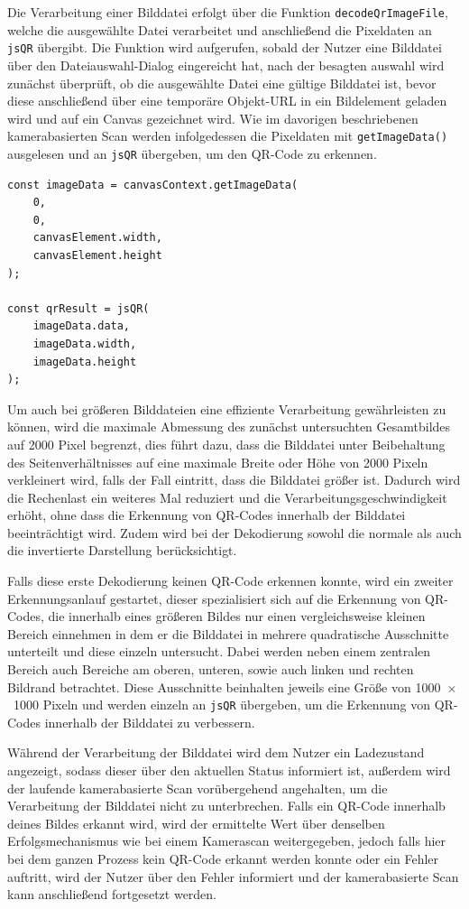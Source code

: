 ﻿\documentclass[oneside]{ausarbeitung}
\begin{document}
Die Verarbeitung einer Bilddatei erfolgt über die Funktion \texttt{decodeQrImageFile}, welche die ausgewählte Datei verarbeitet und
anschließend die Pixeldaten an \texttt{jsQR} übergibt. Die Funktion wird aufgerufen, sobald der Nutzer eine Bilddatei über den Dateiauswahl-Dialog
eingereicht hat, nach der besagten auswahl wird zunächst überprüft, ob die ausgewählte Datei eine gültige Bilddatei ist, bevor diese anschließend
über eine temporäre Objekt-URL in ein Bildelement geladen wird und auf ein Canvas gezeichnet wird. Wie im davorigen beschriebenen kamerabasierten
Scan werden infolgedessen die Pixeldaten mit \texttt{getImageData()} ausgelesen und an \texttt{jsQR} übergeben, um den QR-Code zu erkennen. 


\begin{verbatim}
const imageData = canvasContext.getImageData(
    0,
    0,
    canvasElement.width,
    canvasElement.height
);

const qrResult = jsQR(
    imageData.data,
    imageData.width,
    imageData.height
);
\end{verbatim}


Um auch bei größeren Bilddateien eine effiziente Verarbeitung gewährleisten zu können, wird die maximale Abmessung des zunächst untersuchten
Gesamtbildes auf 2000 Pixel begrenzt, dies führt dazu, dass die Bilddatei unter Beibehaltung des Seitenverhältnisses auf eine maximale Breite oder
Höhe von 2000 Pixeln verkleinert wird, falls der Fall eintritt, dass die Bilddatei größer ist. Dadurch wird die Rechenlast ein weiteres Mal reduziert
und die Verarbeitungsgeschwindigkeit erhöht, ohne dass die Erkennung von QR-Codes innerhalb der Bilddatei beeinträchtigt wird. Zudem wird bei
der Dekodierung sowohl die normale als auch die invertierte Darstellung berücksichtigt.

Falls diese erste Dekodierung keinen QR-Code erkennen konnte, wird ein zweiter Erkennungsanlauf gestartet, dieser spezialisiert sich auf die Erkennung
von QR-Codes, die innerhalb eines größeren Bildes nur einen vergleichsweise kleinen Bereich einnehmen in dem er die Bilddatei in mehrere quadratische
Ausschnitte unterteilt und diese einzeln untersucht. Dabei werden neben einem zentralen Bereich auch Bereiche am oberen, unteren, sowie auch linken
und rechten Bildrand betrachtet. Diese Ausschnitte beinhalten jeweils eine Größe von 1000~$\times$~1000 Pixeln und werden einzeln an \texttt{jsQR} 
übergeben, um die Erkennung von QR-Codes innerhalb der Bilddatei zu verbessern.

Während der Verarbeitung der Bilddatei wird dem Nutzer ein Ladezustand angezeigt, sodass dieser über den aktuellen Status informiert ist, außerdem
wird der laufende kamerabasierte Scan vorübergehend angehalten, um die Verarbeitung der Bilddatei nicht zu unterbrechen. Falls ein QR-Code innerhalb 
deines Bildes erkannt wird, wird der ermittelte Wert über denselben Erfolgsmechanismus wie bei einem Kamerascan weitergegeben, jedoch falls hier bei
dem ganzen Prozess kein QR-Code erkannt werden konnte oder ein Fehler auftritt, wird der Nutzer über den Fehler informiert und der kamerabasierte Scan
kann anschließend fortgesetzt werden.
\end{document}
